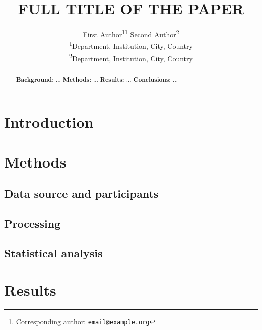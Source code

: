 \documentclass{article}
\title{FULL TITLE OF THE PAPER}
\author{
  First Author\textsuperscript{1}\thanks{Corresponding author: \texttt{email@example.org}} \And
  Second Author\textsuperscript{2} \\[2pt]
  \textsuperscript{1}Department, Institution, City, Country \\
  \textsuperscript{2}Department, Institution, City, Country
}
\date{}   %
\begin{document}
\maketitle

\begin{abstract}
\textbf{Background:} ...
\textbf{Methods:} ...
\textbf{Results:} ...
\textbf{Conclusions:} ...
\end{abstract}


\section{Introduction}

\section{Methods}
\subsection{Data source and participants}
\subsection{Processing}
\subsection{Statistical analysis}

\section{Results}
\end{document}
